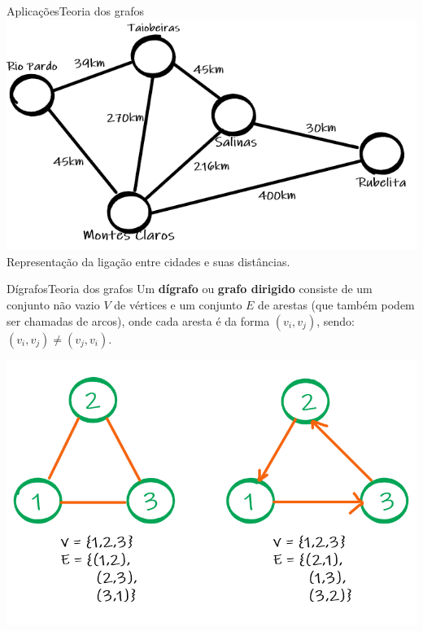 \documentclass[t]{beamer}
\begin{document}
\begin{ftst}{Aplicações}{Teoria dos grafos}
\vone
\vone
\centering
\includegraphics[scale=0.5]{Figuras/cidades.png}\\
\vone
\vone
Representação da ligação entre cidades e suas distâncias.
\end{ftst}


\begin{ftst}{Dígrafos}{Teoria dos grafos}
\justifying
Um \textbf{dígrafo} ou \textbf{grafo dirigido} consiste de um conjunto não vazio $V$ de vértices e um conjunto $E$ de arestas (que também podem ser chamadas de arcos), onde cada aresta é da forma $(v_i,v_j)$, sendo: $(v_i,v_j) \neq (v_j,v_i)$.
\vone

\centering
\includegraphics[scale=0.5]{Figuras/graph_digrafo.png}\\

\end{ftst}

\end{document}
